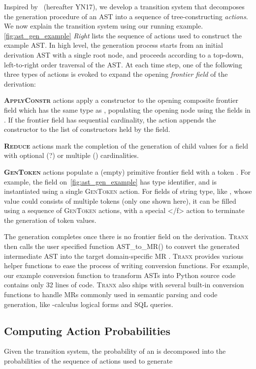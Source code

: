 \documentclass[11pt,a4paper]{article}
\renewcommand{\tt}[1]{\fontfamily{cmtt}\selectfont #1}
\def\model/{\textsc{Tranx}}
\begin{document}
Inspired by~\citet{yin17acl} (hereafter YN17), we develop a transition system that decomposes the generation procedure of an AST into a sequence of tree-constructing \emph{actions}.
We now explain the transition system using our running example. 
\autoref{fig:ast_gen_example} {\it Right} lists the sequence of actions used to construct the example AST.
In high level, the generation process starts from an initial derivation AST with a single root node, and proceeds according to a top-down, left-to-right order traversal of the AST.
At each time step, one of the following three types of actions is evoked to expand the opening \emph{frontier field}  of the derivation:


\textbf{\textsc{ApplyConstr}} actions apply a constructor  to the opening composite frontier field which has the same type as , populating the opening node using the fields in .
If the frontier field has sequential cardinality, the action appends the constructor to the list of constructors held by the field.

\textbf{\textsc{Reduce}} actions mark the completion of the generation of child values for a field with optional (?) or multiple () cardinalities.

\textbf{\textsc{GenToken}} actions populate a (empty) primitive frontier field with a token .
For example, the field  on~\autoref{fig:ast_gen_example} has type {\tt identifier}, and is instantiated using a single \textsc{GenToken} action.
For fields of {\tt string} type, like , whose value could consists of multiple tokens (only one shown here), it can be filled using a sequence of \textsc{GenToken} actions, with a special {\tt </f>} action to terminate the generation of token values.


The generation completes once there is no frontier field on the derivation.
\model/ then calls the user specified function {\tt AST\_to\_MR()} to convert the generated intermediate AST  into the target domain-specific MR .
\model/ provides various helper functions to ease the process of writing conversion functions.
For example, our example conversion function to transform ASTs into Python source code contains only 32 lines of code.
\model/ also ships with several built-in conversion functions to handle MRs commonly used in semantic parsing and code generation, like -calculus logical forms and SQL queries.


\vspace{-1.5mm}
\subsection{Computing Action Probabilities }
\vspace{-1.5mm}
\label{sec:model:network}
Given the transition system, the probability of an  is decomposed into the probabilities of the sequence of actions used to generate 
\end{document}
